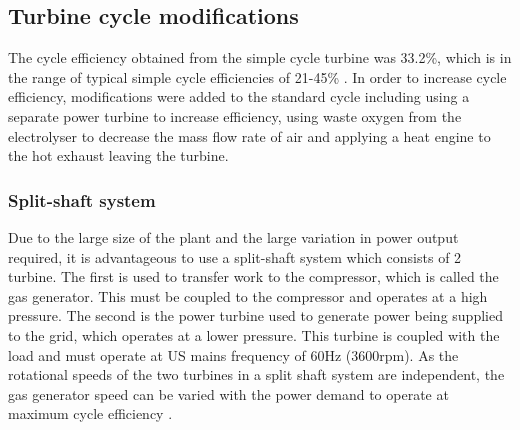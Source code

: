 \subsection{Turbine cycle modifications }
The cycle efficiency obtained from the simple cycle turbine was 33.2\%, which is in the range of typical simple cycle efficiencies of 21-45\% \cite{boyce}. In order to increase cycle efficiency, modifications were added to the standard cycle including using a separate power turbine to increase efficiency, using waste oxygen from the electrolyser to decrease the mass flow rate of air and applying a heat engine to the hot exhaust leaving the turbine. 

\subsubsection{Split-shaft system}
Due to the large size of the plant and the large variation in power output required, it is advantageous to use a split-shaft system which consists of 2 turbine. The first is used to transfer work to the compressor, which is called the gas generator. This must be coupled to the compressor and operates at a high pressure. The second is the power turbine used to generate power being supplied to the grid, which operates at a lower pressure. This turbine is coupled with the load and must operate at US mains frequency of 60Hz (3600rpm). As the rotational speeds of the two turbines in a split shaft system are independent, the gas generator speed can be varied with the power demand to operate at maximum cycle efficiency \cite{thermonotes}.  %

